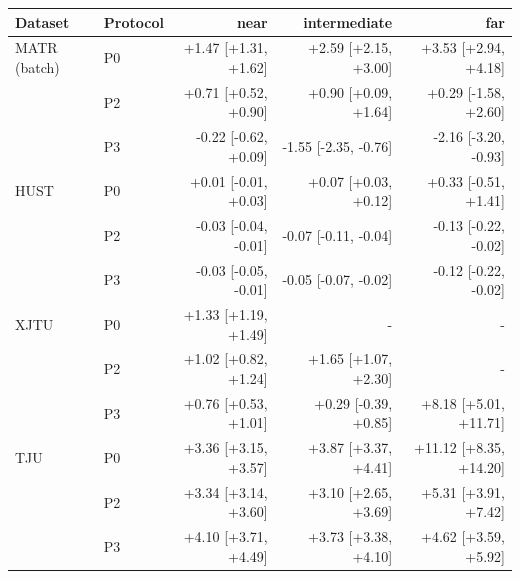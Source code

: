 \begin{tabular}{llrrr}
\toprule
Dataset & Protocol & near & intermediate & far \\
\midrule
MATR (batch) & P0 & +1.47 [+1.31, +1.62] & +2.59 [+2.15, +3.00] & +3.53 [+2.94, +4.18] \\
 & P2 & +0.71 [+0.52, +0.90] & +0.90 [+0.09, +1.64] & +0.29 [-1.58, +2.60] \\
 & P3 & -0.22 [-0.62, +0.09] & -1.55 [-2.35, -0.76] & -2.16 [-3.20, -0.93] \\
HUST & P0 & +0.01 [-0.01, +0.03] & +0.07 [+0.03, +0.12] & +0.33 [-0.51, +1.41] \\
 & P2 & -0.03 [-0.04, -0.01] & -0.07 [-0.11, -0.04] & -0.13 [-0.22, -0.02] \\
 & P3 & -0.03 [-0.05, -0.01] & -0.05 [-0.07, -0.02] & -0.12 [-0.22, -0.02] \\
XJTU & P0 & +1.33 [+1.19, +1.49] & - & - \\
 & P2 & +1.02 [+0.82, +1.24] & +1.65 [+1.07, +2.30] & - \\
 & P3 & +0.76 [+0.53, +1.01] & +0.29 [-0.39, +0.85] & +8.18 [+5.01, +11.71] \\
TJU & P0 & +3.36 [+3.15, +3.57] & +3.87 [+3.37, +4.41] & +11.12 [+8.35, +14.20] \\
 & P2 & +3.34 [+3.14, +3.60] & +3.10 [+2.65, +3.69] & +5.31 [+3.91, +7.42] \\
 & P3 & +4.10 [+3.71, +4.49] & +3.73 [+3.38, +4.10] & +4.62 [+3.59, +5.92] \\
\bottomrule
\end{tabular}
